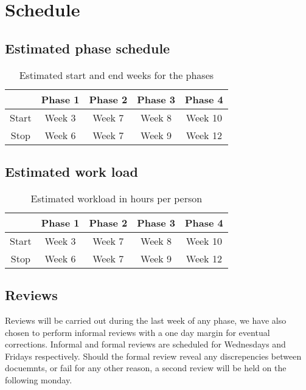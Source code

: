 \documentclass{article}
\begin{document}
\newpage
\section{Schedule}
    \subsection{Estimated phase schedule}
        \begin{table}[h]
            \centering
            \begin{tabular}{|c|c|c|c|c|}
                \hline
                            & Phase 1 & Phase 2 & Phase 3 & Phase 4 \\
                 \hline
                 Start      & Week 3  & Week 7  & Week 8  & Week 10  \\
                 \hline
                 Stop       & Week 6  & Week 7  & Week 9  & Week 12  \\
                 \hline
            \end{tabular}
            \caption{Estimated start and end weeks for the phases}
        \end{table}
    
    \subsection{Estimated work load}
        \begin{table}[h]
            \centering
            \begin{tabular}{|c|c|c|c|c|}
                \hline
                            & Phase 1 & Phase 2 & Phase 3 & Phase 4 \\
                 \hline
                 Start      & Week 3  & Week 7  & Week 8  & Week 10  \\
                 \hline
                 Stop       & Week 6  & Week 7  & Week 9  & Week 12  \\
                 \hline
            \end{tabular}
            \caption{Estimated workload in hours per person}
        \end{table}
        
    \subsection{Reviews}
        Reviews will be carried out during the last week of any phase, we have also chosen to perform informal reviews with a one day margin for eventual corrections. Informal and formal reviews are scheduled for Wednesdays and Fridays respectively. Should the formal review reveal any discrepencies between docuemnts, or fail for any other reason, a second review will be held on the following monday.
    
\end{document}
